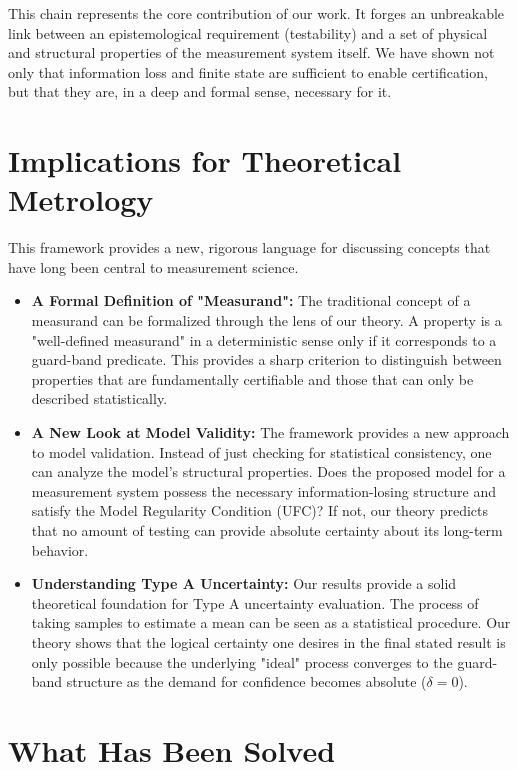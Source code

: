 \documentclass[12pt]{article}
\begin{document}
This chain represents the core contribution of our work. It forges an unbreakable link between an epistemological requirement (testability) and a set of physical and structural properties of the measurement system itself. We have shown not only that information loss and finite state are sufficient to enable certification, but that they are, in a deep and formal sense, necessary for it.

\section{Implications for Theoretical Metrology}

This framework provides a new, rigorous language for discussing concepts that have long been central to measurement science.

\begin{itemize}
    \item \textbf{A Formal Definition of "Measurand":} The traditional concept of a measurand can be formalized through the lens of our theory. A property is a "well-defined measurand" in a deterministic sense only if it corresponds to a guard-band predicate. This provides a sharp criterion to distinguish between properties that are fundamentally certifiable and those that can only be described statistically.

    \item \textbf{A New Look at Model Validity:} The framework provides a new approach to model validation. Instead of just checking for statistical consistency, one can analyze the model's structural properties. Does the proposed model for a measurement system possess the necessary information-losing structure and satisfy the Model Regularity Condition (UFC)? If not, our theory predicts that no amount of testing can provide absolute certainty about its long-term behavior.

    \item \textbf{Understanding Type A Uncertainty:} Our results provide a solid theoretical foundation for Type A uncertainty evaluation. The process of taking samples to estimate a mean can be seen as a statistical procedure. Our theory shows that the logical certainty one desires in the final stated result is only possible because the underlying "ideal" process converges to the guard-band structure as the demand for confidence becomes absolute ($\delta=0$).
\end{itemize}

\section{What Has Been Solved}
\end{document}
